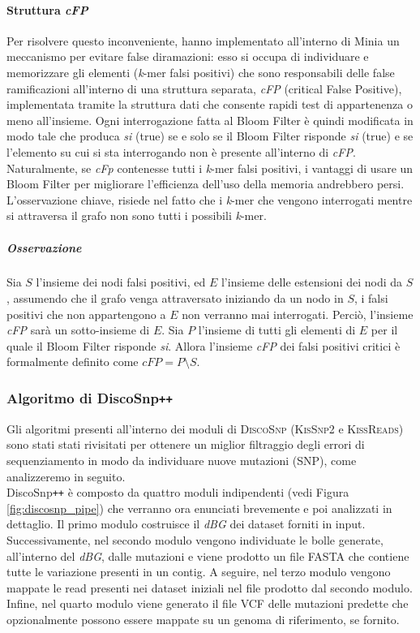 \documentclass[../main.tex]{subfiles}
\begin{document}
\paragraph{Struttura \textit{cFP}} Per risolvere questo inconveniente,\cite{chikhi2013space} hanno implementato all'interno di Minia un meccanismo per evitare false diramazioni: esso si occupa di individuare e memorizzare gli elementi (\textit{k}-mer falsi positivi) che sono responsabili delle false ramificazioni all'interno di una struttura separata, \textit{cFP} (critical False Positive), implementata tramite la struttura dati che consente rapidi test di appartenenza o meno all'insieme. Ogni interrogazione fatta al Bloom Filter è quindi modificata in modo tale che produca \textit{si} (true) se e solo se il Bloom Filter risponde \textit{si} (true) e se l'elemento su cui si sta interrogando non è presente all'interno di \textit{cFP}. Naturalmente, se \textit{cFp} contenesse tutti i \textit{k}-mer falsi positivi, i vantaggi di usare un Bloom Filter per migliorare l'efficienza dell'uso della memoria andrebbero persi. L'osservazione chiave, risiede nel fatto che i \textit{k}-mer che vengono interrogati mentre si attraversa il grafo non sono tutti i possibili \textit{k}-mer. 

\subparagraph{Osservazione} Sia $S$ l'insieme dei nodi falsi positivi, ed $E$ l'insieme delle estensioni dei nodi da $S$, assumendo che il grafo venga attraversato iniziando da un nodo in $S$, i falsi positivi che non appartengono a $E$ non verranno mai interrogati. Perciò, l'insieme \textit{cFP} sarà un sotto-insieme di $E$. Sia $P$ l'insieme di tutti gli elementi di $E$ per il quale il Bloom Filter risponde \textit{si}. Allora l'insieme \textit{cFP} dei falsi positivi critici è formalmente definito come $cFP = P \setminus S$.

\subsubsection{Algoritmo di DiscoSnp\texttt{++}}
Gli algoritmi presenti all'interno dei moduli di \textsc{DiscoSnp} (\textsc{KisSnp2} e \textsc{KissReads}) sono stati stati rivisitati per ottenere un miglior filtraggio degli errori di sequenziamento in modo da individuare nuove mutazioni (SNP), come analizzeremo in seguito.\\

\noindent
DiscoSnp\texttt{++} è composto da quattro moduli indipendenti (vedi Figura \ref{fig:discosnp_pipe}) che verranno ora enunciati brevemente e poi analizzati in dettaglio. Il primo modulo costruisce il \textit{dBG} dei dataset forniti in input. Successivamente, nel secondo modulo vengono individuate le bolle generate, all'interno del \textit{dBG}, dalle mutazioni e viene prodotto un file FASTA che contiene tutte le variazione presenti in un contig. A seguire, nel terzo modulo vengono mappate le read presenti nei dataset iniziali nel file prodotto dal secondo modulo. Infine, nel quarto modulo viene generato il file VCF delle mutazioni predette che opzionalmente possono essere mappate su un genoma di riferimento, se fornito.
\end{document}
